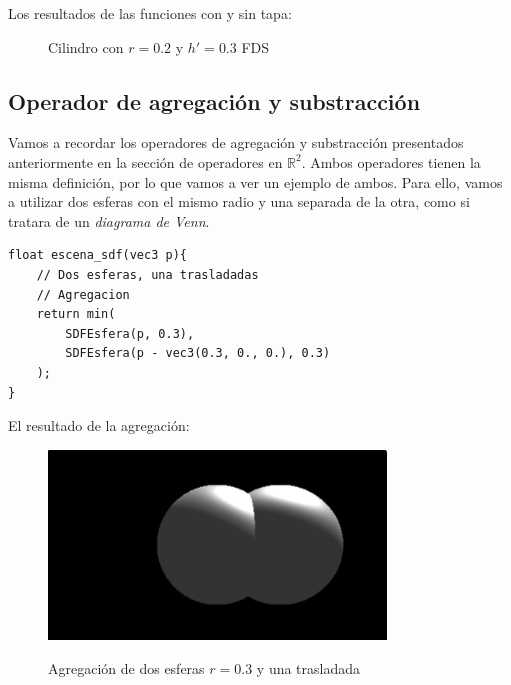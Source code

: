 Los resultados de las funciones con y sin tapa:

\begin{figure}[H]
  \centering
  \captionsetup{justification=centering}%
  \hfill
  \caption{Cilindro con \(r=0.2\) y \(h'=0.3\)  FDS}
\end{figure}

\subsection{Operador de agregación y substracción}
Vamos a recordar los operadores de agregación y substracción presentados anteriormente en la sección de operadores en \(\mathbb{R}^2\). Ambos operadores tienen la misma definición, por lo que vamos a ver un ejemplo de ambos. Para ello, vamos a utilizar dos esferas con el mismo radio y una separada de la otra, como si tratara de un \textit{diagrama de Venn}.
\begin{lstlisting}
float escena_sdf(vec3 p){
    // Dos esferas, una trasladadas
    // Agregacion
    return min(
        SDFEsfera(p, 0.3),
        SDFEsfera(p - vec3(0.3, 0., 0.), 0.3)
    );
}
\end{lstlisting}
El resultado de la agregación:
\begin{figure}[H]
  \centering
  \captionsetup{justification=centering}%
  \includegraphics[width=0.8\textwidth]{secciones/imagenes/sdf_add_3d.jpeg}\label{fig:add3d}
  \caption{Agregación de dos esferas \(r=0.3\) y una trasladada}
\end{figure}

